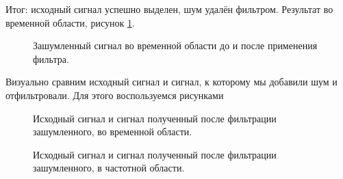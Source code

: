 \documentclass[a4paper,14pt]{extarticle}
\begin{document}
Итог: исходный сигнал успешно выделен, шум удалён фильтром.
Результат во временной области, рисунок \ref{010}.

\begin{figure}[H]
\caption{Зашумленный сигнал во временной области до и после применения фильтра.}
\label{010}
\end{figure}

Визуально сравним исходный сигнал и сигнал, к которому мы добавили шум и отфильтровали. Для этого воспользуемся рисунками

\begin{figure}[H]
\caption{Исходный сигнал и сигнал полученный после фильтрации зашумленного, во временной области.}
\label{011}
\end{figure}

\begin{figure}[H]
\caption{Исходный сигнал и сигнал полученный после фильтрации зашумленного, в частотной области.}
\label{012}
\end{figure}
\end{document}

